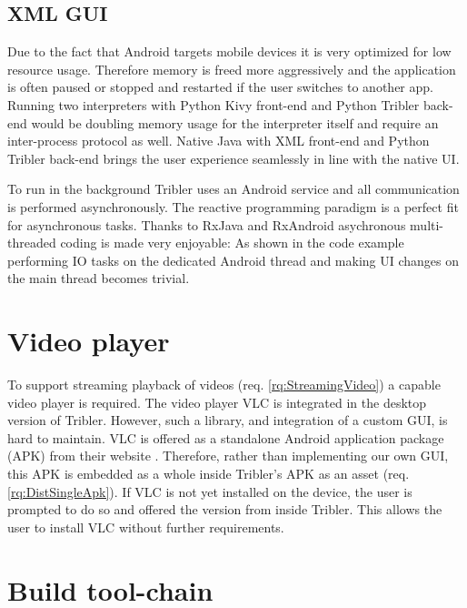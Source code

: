 \subsection{XML GUI} %
Due to the fact that Android targets mobile devices it is very optimized for low resource usage.
Therefore memory is freed more aggressively and the application is often paused or stopped and restarted if the user switches to another app.
Running two interpreters with Python Kivy front-end and Python Tribler back-end would be doubling memory usage for the interpreter itself and require an inter-process protocol as well.
Native Java with XML front-end and Python Tribler back-end brings the user experience seamlessly in line with the native UI.

To run in the background Tribler uses an Android service and all communication is performed asynchronously.
The reactive programming paradigm is a perfect fit for asynchronous tasks.
Thanks to RxJava and RxAndroid asychronous multi-threaded coding is made very enjoyable:
As shown in the code example performing IO tasks on the dedicated Android thread and making UI changes on the main thread becomes trivial.


\section{Video player}
To support streaming playback of videos (req. \ref{rq:StreamingVideo}) a capable video player is required.
The video player VLC is integrated in the desktop version of Tribler.
However, such a library, and integration of a custom GUI, is hard to maintain.
VLC is offered as a standalone Android application package (APK) from their website \cite{vlc-apk}.
Therefore, rather than implementing our own GUI, this APK is embedded as a whole inside Tribler's APK as an asset (req. \ref{rq:DistSingleApk}).
If VLC is not yet installed on the device, the user is prompted to do so and offered the version from inside Tribler.
This allows the user to install VLC without further requirements.


\section{Build tool-chain}\label{sec:build_toolchain}


